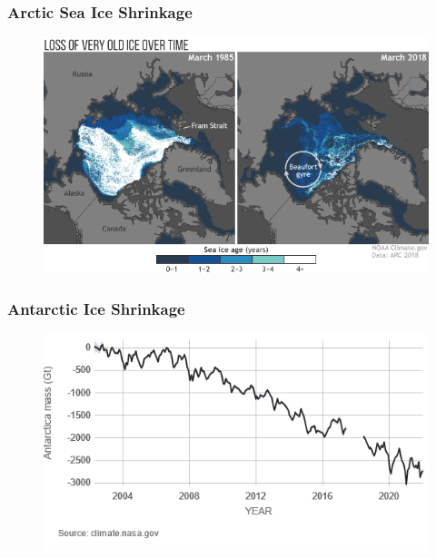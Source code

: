 \documentclass{beamer}
\begin{document}
\begin{frame} 
	\frametitle{\LARGE{Arctic Sea Ice Shrinkage}}
	\begin{figure}[ht!]
		\centering
		\includegraphics[width=\textwidth,height=0.8\textheight, keepaspectratio]{arctic_sea_ice.png}
	\end{figure}
\end{frame}

\begin{frame} 
	\frametitle{\LARGE{Antarctic Ice Shrinkage}}
	\begin{figure}[ht!]
		\centering
		\includegraphics[width=\textwidth,height=0.8\textheight,keepaspectratio]{LandIceAntarctica.png}
	\end{figure}
\end{frame}
\end{document}
